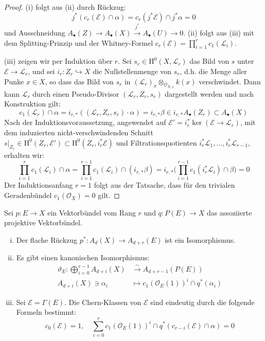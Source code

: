 \documentclass[10pt,a4paper]{article}
\begin{document}
\begin{proof}
(i) folgt aus (ii) durch Rückzug:
\[ j^\ast(c_r(\mathcal{E})\cap\alpha) = c_r(j^\ast\mathcal{E})\cap j^\ast\alpha = 0 \]
und Ausschneidung $A_\bullet(Z)\to A_\bullet(X) \stackrel{j^\ast}{\to} A_\bullet(U)\to 0$. (ii) folgt aus (iii) mit dem Splitting-Prinzip und der Whitney-Formel $c_r(\mathcal{E}) = \prod_{i=1}^rc_1(\mathcal{L}_i)$.

(iii) zeigen wir per Induktion über $r$. Sei $s_r\in\mathrm{H}^0(X, \mathcal{L}_r)$ das Bild von $s$ unter $\mathcal{E}\to\mathcal{L}_r$, und sei $i_r: Z_r\hookrightarrow X$ die Nullstellenmenge von $s_r$, d.h. die Menge aller Punke $x\in X$, so dass das Bild von $s_r$ in $(\mathcal{L}_r)_x \otimes_{\mathcal{O}_{X,x}} k(x)$ verschwindet. Dann kann $\mathcal{L}_r$ durch einen Pseudo-Divisor $(\mathcal{L}_r,Z_r,s_r)$ dargestellt werden und nach Konstruktion gilt:
\[ c_1(\mathcal{L}_r)\cap \alpha = i_{r,\ast}((\mathcal{L}_r, Z_r, s_r)\cdot\alpha) = i_{r,\ast}\beta \in i_{r,\ast}A_\bullet(Z_r)\subset A_\bullet(X) \]
Nach der Induktionsvoraussetzung, angewendet auf $\mathcal{E}' = i_r^\ast \ker(\mathcal{E}\to\mathcal{L}_r)$, mit dem induzierten nicht-verschwindenden Schnitt $s|_{Z_r}\in\mathrm{H}^0(Z_r,\mathcal{E}')\subset \mathrm{H}^0(Z_r, i_r^\ast\mathcal{E})$ und Filtrationsquotienten $i^\ast_r\mathcal{L}_1,\ldots,i_r^\ast\mathcal{L}_{r-1}$, erhalten wir:
\[ \prod_{i=1}^rc_1(\mathcal{L}_i)\cap\alpha = \prod_{i=1}^{r-1} c_1(\mathcal{L}_i)\cap (i_{r,\ast}\beta) = i_{r,\ast}\Big(\prod_{i=1}^{r-1} c_1(i_r^\ast\mathcal{L}_i)\cap\beta\Big) = 0 \]
Der Induktionsanfang $r=1$ folgt aus der Tatsache, dass für den trivialen Geradenbündel $c_1(\mathcal{O}_X) = 0$ gilt.
\end{proof}

\begin{theorem}
Sei $p:E\to X$ ein Vektorbündel vom Rang $r$ und $q:P(E)\to X$ das assoziierte projektive Vektorbündel.
\begin{enumerate}[(i)]
\item Der flache Rückzug $p^\ast: A_d(X)\to A_{d+r}(E)$ ist ein Isomorphismus.
\item Es gibt einen kanonischen Isomorphismus:
\begin{align*}
\vartheta_E: \bigoplus_{i=0}^{r-1}A_{d+i}(X) &\stackrel{\sim}{\longrightarrow} A_{d+r-1}(P(E))\\
A_{d+i}(X)\ni \alpha_i &\longmapsto c_1(\mathcal{O}_E(1))^i\cap q^\ast(\alpha_i)
\end{align*}
\item Sei $\mathcal{E} = \Gamma(E)$. Die Chern-Klassen von $\mathcal{E}$ sind eindeutig durch die folgende Formeln bestimmt:
\[ c_0(\mathcal{E}) = 1,\quad \sum_{i=0}^r c_1(\mathcal{O}_E(1))^i\cap q^\ast(c_{r-i}(\mathcal{E})\cap\alpha) = 0 \]
\end{enumerate}
\end{theorem}
\end{document}
